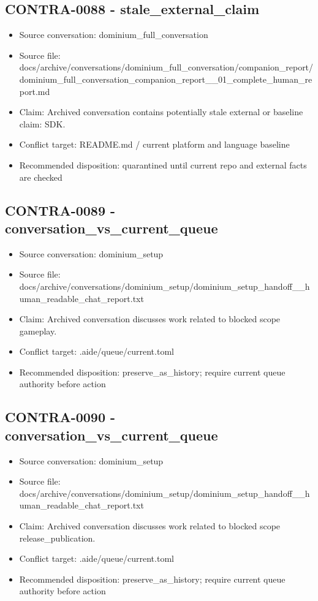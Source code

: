 \documentclass[11pt,a4paper]{report}
\begin{document}
\subsection{CONTRA-0088 - stale\_external\_claim}

\begin{itemize}
\item Source conversation: dominium\_full\_conversation
\item Source file: docs/archive/conversations/dominium\_full\_conversation/companion\_report/dominium\_full\_conversation\_companion\_report\_\_01\_complete\_human\_report.md
\item Claim: Archived conversation contains potentially stale external or baseline claim: SDK.
\item Conflict target: README.md / current platform and language baseline
\item Recommended disposition: quarantined until current repo and external facts are checked
\end{itemize}

\subsection{CONTRA-0089 - conversation\_vs\_current\_queue}

\begin{itemize}
\item Source conversation: dominium\_setup
\item Source file: docs/archive/conversations/dominium\_setup/dominium\_setup\_handoff\_\_human\_readable\_chat\_report.txt
\item Claim: Archived conversation discusses work related to blocked scope gameplay.
\item Conflict target: .aide/queue/current.toml
\item Recommended disposition: preserve\_as\_history; require current queue authority before action
\end{itemize}

\subsection{CONTRA-0090 - conversation\_vs\_current\_queue}

\begin{itemize}
\item Source conversation: dominium\_setup
\item Source file: docs/archive/conversations/dominium\_setup/dominium\_setup\_handoff\_\_human\_readable\_chat\_report.txt
\item Claim: Archived conversation discusses work related to blocked scope release\_publication.
\item Conflict target: .aide/queue/current.toml
\item Recommended disposition: preserve\_as\_history; require current queue authority before action
\end{itemize}
\end{document}
